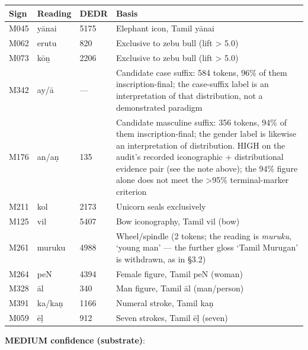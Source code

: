 \documentclass[
]{article}
\newcounter{none} %
\begin{document}
{\def\LTcaptype{none} %
\begin{longtable}[]{@{}lll>{\raggedright\arraybackslash}p{}@{}}
\toprule\noalign{}
Sign & Reading & DEDR & Basis \\
\midrule\noalign{}
\endhead
\bottomrule\noalign{}
\endlastfoot
M045 & yānai & 5175 & Elephant icon, Tamil yānai \\
M062 & erutu & 820 & Exclusive to zebu bull (lift \textgreater{} 5.0) \\
M073 & kōṉ & 2206 & Exclusive to zebu bull (lift \textgreater{} 5.0) \\
M342 & ay/ā & --- & Candidate case suffix: 584 tokens, 96\% of them inscription-final; the case-suffix label is an interpretation of that distribution, not a demonstrated paradigm \\
M176 & an/aṇ & 135 & Candidate masculine suffix: 356 tokens, 94\% of them inscription-final; the gender label is likewise an interpretation of distribution. HIGH on the audit's recorded iconographic + distributional evidence pair (see the note above); the 94\% figure alone does not meet the \textgreater95\% terminal-marker criterion \\
M211 & kol & 2173 & Unicorn seals exclusively \\
M125 & vil & 5407 & Bow iconography, Tamil vil (bow) \\
M261 & muruku & 4988 & Wheel/spindle (2 tokens; the reading is \emph{muruku}, `young man' --- the further gloss `Tamil Murugan' is withdrawn, as in §3.2) \\
M264 & peN & 4394 & Female figure, Tamil peN (woman) \\
M328 & āl & 340 & Man figure, Tamil āl (man/person) \\
M391 & ka/kaṇ & 1166 & Numeral stroke, Tamil kaṇ \\
M059 & ēḷ & 912 & Seven strokes, Tamil ēḷ (seven) \\
\end{longtable}
}

\textbf{MEDIUM confidence (substrate)}:
\end{document}
